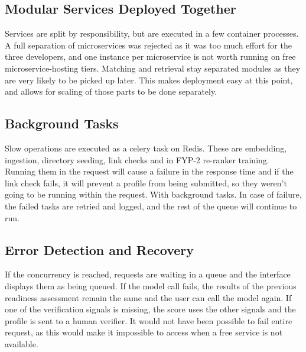 \documentclass{FastFyp}
\begin{document}
\subsection{Modular Services Deployed Together}
Services are split by responsibility, but are executed in a few container processes. A full separation of microservices was rejected as it was too much effort for the three developers, and one instance per microservice is not worth running on free microservice-hosting tiers. Matching and retrieval stay separated modules as they are very likely to be picked up later. This makes deployment easy at this point, and allows for scaling of those parts to be done separately.

\subsection{Background Tasks}
Slow operations are executed as a celery task on Redis. These are embedding, ingestion, directory seeding, link checks and in FYP-2 re-ranker training. Running them in the request will cause a failure in the response time and if the link check fails, it will prevent a profile from being submitted, so they weren't going to be running within the request. With background tasks. In case of failure, the failed tasks are retried and logged, and the rest of the queue will continue to run.

\subsection{Error Detection and Recovery}
If the concurrency is reached, requests are waiting in a queue and the interface displays them as being queued. If the model call fails, the results of the previous readiness assessment remain the same and the user can call the model again. If one of the verification signals is missing, the score uses the other signals and the profile is sent to a human verifier. It would not have been possible to fail entire request, as this would make it impossible to access when a free service is not available.
\end{document}

